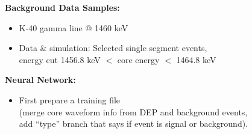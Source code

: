 \documentclass[landscape]{slides}
\begin{document}
\begin{slide}

\textbf{Background Data Samples:}

\begin{itemize}

\item K-40 gamma line @ 1460 keV

\item Data \& simulation: Selected single segment events,
	\\ energy cut 1456.8 keV  $<$ core energy $<$ 1464.8 keV

\end{itemize}

\end{slide}

\begin{slide}

\textbf{Neural Network:}

\begin{itemize}

\item First prepare a training file \\
	
     (merge core waveform info from DEP and background events, \\
     add ``type'' branch that says if event is signal or background).

\end{itemize}

\end{slide}
\end{document}

